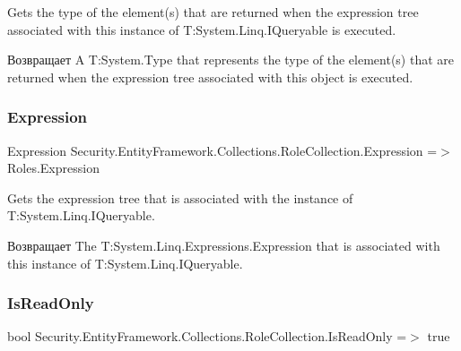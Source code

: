 Gets the type of the element(s) that are returned when the expression tree associated with this instance of T\+:\+System.\+Linq.\+I\+Queryable is executed. 

\begin{DoxyReturn}{Возвращает}
A T\+:\+System.\+Type that represents the type of the element(s) that are returned when the expression tree associated with this object is executed. 
\end{DoxyReturn}
\mbox{\label{class_security_1_1_entity_framework_1_1_collections_1_1_role_collection_ad3e4a6effbcaa065d3f0c77cb9f5543d}} 
\subsubsection{\texorpdfstring{Expression}{Expression}}
{\footnotesize\ttfamily Expression Security.\+Entity\+Framework.\+Collections.\+Role\+Collection.\+Expression =$>$ Roles.\+Expression}



Gets the expression tree that is associated with the instance of T\+:\+System.\+Linq.\+I\+Queryable. 

\begin{DoxyReturn}{Возвращает}
The T\+:\+System.\+Linq.\+Expressions.\+Expression that is associated with this instance of T\+:\+System.\+Linq.\+I\+Queryable. 
\end{DoxyReturn}
\mbox{\label{class_security_1_1_entity_framework_1_1_collections_1_1_role_collection_aa8d1b46f3b573ec7151361cb03c16540}} 
\subsubsection{\texorpdfstring{Is\+Read\+Only}{IsReadOnly}}
{\footnotesize\ttfamily bool Security.\+Entity\+Framework.\+Collections.\+Role\+Collection.\+Is\+Read\+Only =$>$ true}



